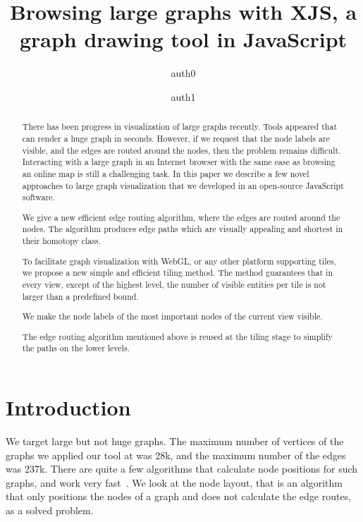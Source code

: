 \documentclass{gd-llncs}
\begin{document}
\title{Browsing large graphs with XJS, a graph drawing tool in JavaScript }
\author{%
  auth0  \and
  auth1
}%
\maketitle

\begin{abstract}
  There has been progress in visualization of large graphs recently. Tools appeared that can render a huge graph in seconds. However, if we request that the node labels are visible, and the edges are routed around the nodes, then the problem remains difficult. Interacting with a large graph in an Internet browser with the same ease as browsing an online map is still a challenging task.
In this paper we describe a few novel approaches to large graph visualization that we developed in an open-source JavaScript software.

We give a new efficient edge routing algorithm, where the edges are routed around the nodes. The algorithm produces edge paths which are visually appealing and shortest in their homotopy class.

To facilitate graph visualization with WebGL, or any other platform supporting tiles, we propose a new simple and efficient tiling method. The method guarantees that in every view, except of the highest level, the number of visible entities per tile is not larger than a predefined bound.

We make the node labels of the most important nodes of the current view visible.

The edge routing algorithm mentioned above is reused at the tiling stage to simplify the paths on the lower levels. 
\end{abstract}


\section*{Introduction}

\label{sec:intro}

We target large but not huge graphs. The maximum number of vertices of the graphs we applied our tool at was 28k, 
and the maximum number of the edges was 237k. There are quite a few algorithms that calculate node positions for such graphs, and work very fast~\cite{hu2015visualizing,brandes2007eigensolver}. We look at the node layout, that is an algorithm that only positions the nodes of a graph and does not calculate the edge routes, as a solved problem.
\end{document}
